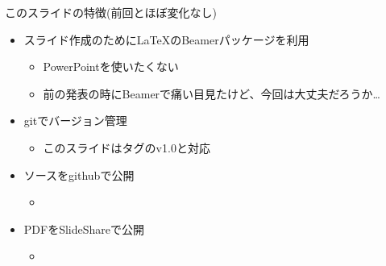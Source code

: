\begin{frame}{このスライドの特徴(前回とほぼ変化なし)}
 \begin{itemize}
  \item スライド作成のために\LaTeX のBeamerパッケージを利用
        \begin{itemize}
         \item PowerPointを使いたくない
         \item 前の発表の時にBeamerで痛い目見たけど、今回は大丈夫だろうか…
        \end{itemize}
  \item gitでバージョン管理
        \begin{itemize}
         \item このスライドはタグのv1.0と対応
        \end{itemize}
  \item ソースをgithubで公開
        \begin{itemize}
         \item \href{https://github.com/sakabar/prml_titech_8-1_8-2}{}
        \end{itemize}
  \item PDFをSlideShareで公開
        \begin{itemize}
         \item \href{http://www.slideshare.net/takafumisakakibara75/slide-44207685}{}
        \end{itemize}
 \end{itemize}
\end{frame}
